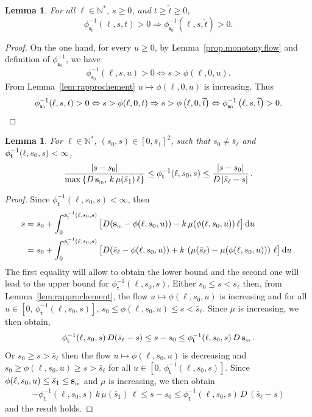 \documentclass[10pt]{amsart}
\newtheorem{lemm}[theo]{Lemma}\newtheorem{prop}[theo]{Proposition}\newtheorem{coro}[theo]{Corollary}\newtheorem{conj}[theo]{Conjecture}
\theoremstyle{definition}\newtheorem{defi}[theo]{Definition}\newtheorem{rema}[theo]{Remark}\newtheorem{exam}[theo]{Example}\newtheorem{exem}[theo]{Example}\newtheorem{nota}[theo]{Notation}
\newcommand{\NN}{\mathbb{N}}
\newcommand{\Sin}{{\mathbf s}_{\textrm{\tiny\rm in}}}
\newcommand{\dif}{\mathrm{d}}
\newcommand{\barmu}{\mu(\bar s_1)}
\newcommand{\phit}{\phi_\textsf{t}^{-1}}
\newcommand{\phis}{\phi_{\textsf{s}_0}^{-1}}
\newcommand{\1}{\mathbf{1}}
\begin{document}
\begin{lemm}\label{lem:phispos}
For all $\ell \in \NN^*$, $s\geq 0$, and $t\geq \widetilde{t}\geq 0$,
\[
\phis(\ell,s,t)>0 \Rightarrow \phis\left(\ell,s,\widetilde{t}\right)>0.
\]
\end{lemm}
\begin{proof}
On the one hand, for every $u\geq 0$, by Lemma~\ref{prop.monotony.flow} and definition of $\phis$, we have
\[
\phis(\ell,s,u)>0 \Leftrightarrow s> \phi(\ell,0,u).
\]
From Lemma~\ref{lem:rapprochement} $u \mapsto \phi(\ell,0,u)$ is increasing. Thus
\[
\phis(\ell,s,t)>0 \Leftrightarrow s> \phi(\ell,0,t) \Rightarrow s> \phi\left(\ell,0,\widetilde{t}\right) \Leftrightarrow \phis\left(\ell,s,\widetilde{t}\right)>0. \qedhere
\]
\end{proof}
\begin{lemm}\label{lemme.control.phi_moins_1}
For $\ell \in \NN^*$, $(s_0,s)\in [0,\bar s_1]^2$, such that $s_0\neq \bar s_\ell$ and $\phit(\ell,s_0,s)\linebreak<\infty$,
\[
\frac{|s-s_0|}{\max\left\{D\,\Sin,\,k\,\barmu\,\ell\right\}} \leq \phit(\ell,s_0,s) \leq \frac{|s-s_0|}{D\,|\bar s_\ell-s|}\,.
\]
\end{lemm}
\begin{proof}
Since $\phit(\ell,s_0,s)<\infty$, then
\begin{align*}
s &= s_0 + \int_0^{\phit(\ell,s_0,s)}\big[D(\Sin-\phi(\ell,s_0,u))-k\,\mu(\phi(\ell,s_0,u))\,\ell\big]\,\dif u
\\
&= s_0 + \int_0^{\phit(\ell,s_0,s)}\big[D(\bar s_\ell-\phi(\ell,s_0,u))+k\,\left(\mu(\bar s_\ell)-\mu(\phi(\ell,s_0,u))\right)\,\ell\big]\,\dif u\,.
\end{align*}
The first equality will allow to obtain the lower bound and the second one will lead to the upper bound for $\phit(\ell,s_0,s)$. Either $s_0\leq s < \bar s_\ell$ then, from Lemma~\ref{lem:rapprochement}, the flow $u \mapsto \phi(\ell,s_0,u)$ is increasing and for all $u\in[0,\,\phit(\ell,s_0,s)]$, $s_0\leq \phi(\ell,s_0,u) \leq s < \bar s_\ell$. Since $\mu$ is increasing, we then obtain,
\begin{align*}
\phit(\ell,s_0,s)\,D(\bar s_\ell-s)
\leq s-s_0 \leq \phit(\ell,s_0,s)\,D\,\Sin\,.
\end{align*}
Or $s_0 \geq s> \bar s_\ell$ then the flow $u \mapsto \phi(\ell,s_0,u)$ is decreasing and $s_0\geq \phi(\ell,s_0,u) \geq s > \bar s_\ell$ for all $u\in[0,\,\phit(\ell,s_0,s)]$. Since $\phi(\ell,s_0,u)\leq \bar s_1\leq \Sin$ and $\mu$ is increasing, we then obtain
\begin{align*}
- \phit(\ell,s_0,s)\,k\,\barmu\,\ell
\leq s-s_0 \leq \phit(\ell,s_0,s)\,D\,(\bar s_\ell-s)
\end{align*}
and the result holds.
\end{proof}
\end{document}
